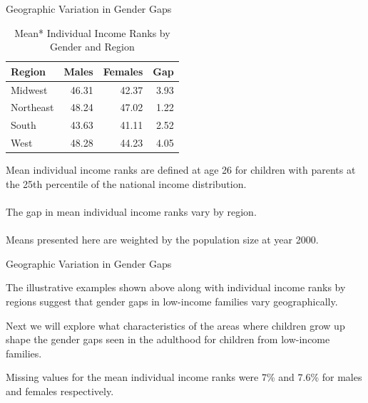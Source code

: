 \documentclass{beamer}
\begin{document}
\begin{frame}{Geographic Variation in Gender Gaps}

\begin{table}[ht]
	\centering
	\caption{Mean* Individual Income Ranks by Gender and Region}
	\begin{tabular}{lrrr}
		\hline
		Region & Males & Females & Gap \\ 
		\hline
		Midwest & 46.31 & 42.37 & 3.93 \\ 
		Northeast & 48.24 & 47.02 & 1.22 \\ 
		South & 43.63 & 41.11 & 2.52 \\ 
		West & 48.28 & 44.23 & 4.05 \\ 
		\hline
	\end{tabular}
\end{table}

Mean individual income ranks are defined at age 26 for children with parents at the 25th percentile of the national income distribution.\\
\vline\\
The gap in mean individual income ranks vary by region.\\
\vline\\
{\tiny * Means presented here are weighted by the population size at year 2000.}

\end{frame}


\begin{frame}{Geographic Variation in Gender Gaps}
\begin{block}{}
	\centering The illustrative examples shown above along with individual income ranks by regions suggest that gender gaps in low-income families vary geographically. 
\end{block}
\begin{block}{}
	\centering
	Next we will explore what characteristics of the areas where children grow up shape the gender gaps seen in the adulthood for children from low-income families.
\end{block}
\end{frame}

\begin{frame}
Missing values for the mean individual income ranks were 7\% and 7.6\% for males and females respectively.
\end{frame}
\end{document}
